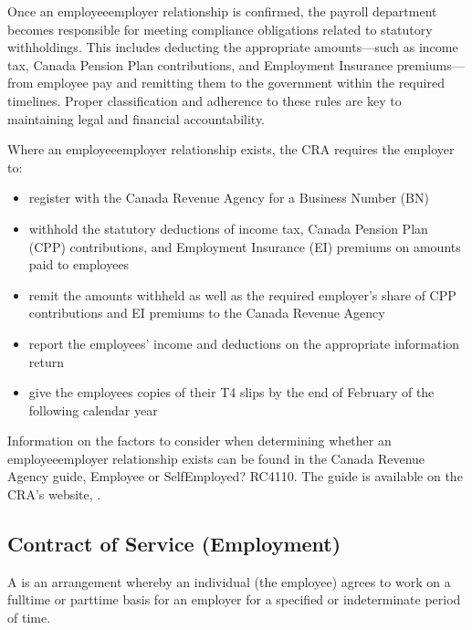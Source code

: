 \documentclass[letterpaper,10pt,english]{sphinxmanual}
\begin{document}
\sphinxAtStartPar
Once an employee\sphinxhyphen{}employer relationship is confirmed, the payroll department becomes responsible for meeting compliance obligations related to statutory withholdings. This includes deducting the appropriate amounts—such as income tax, Canada Pension Plan contributions, and Employment Insurance premiums—from employee pay and remitting them to the government within the required timelines. Proper classification and adherence to these rules are key to maintaining legal and financial accountability.

\sphinxAtStartPar
Where an employee\sphinxhyphen{}employer relationship exists, the CRA requires the employer to:
\begin{itemize}
\item {} 
\sphinxAtStartPar
register with the Canada Revenue Agency for a Business Number (BN)

\item {} 
\sphinxAtStartPar
withhold the statutory deductions of income tax, Canada Pension Plan (CPP) contributions, and Employment Insurance (EI) premiums on amounts paid to employees

\item {} 
\sphinxAtStartPar
remit the amounts withheld as well as the required employer’s share of CPP contributions and EI premiums to the Canada Revenue Agency

\item {} 
\sphinxAtStartPar
report the employees’ income and deductions on the appropriate information return

\item {} 
\sphinxAtStartPar
give the employees copies of their T4 slips by the end of February of the following calendar year

\end{itemize}

\sphinxAtStartPar
Information on the factors to consider when determining whether an employee\sphinxhyphen{}employer relationship exists can be found in the
Canada Revenue Agency guide, Employee or Self\sphinxhyphen{}Employed? \sphinxhyphen{} RC4110. The guide is available on the CRA’s website,
.


\subsection{Contract of Service (Employment)}
\label{\detokenize{compliance:contract-of-service-employment}}
\sphinxAtStartPar
A  is an arrangement whereby an individual (the employee) agrees to
work on a full\sphinxhyphen{}time or part\sphinxhyphen{}time basis for an employer for a specified or indeterminate period
of time.
\end{document}
